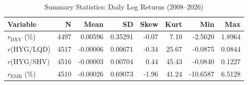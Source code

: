 \begin{table}[H]
\centering
\begin{tabular}{lrrrrrrr}
  \toprule
Variable & N & Mean & SD & Skew & Kurt & Min & Max \\ 
  \midrule
$r_{\text{DXY}}$ (\%) & 4497 & 0.00596 & 0.35291 & -0.07 & 7.10 & -2.5620 & 1.8964 \\
  $r$(HYG/LQD) & 4517 & -0.00006 & 0.00671 & -0.34 & 25.67 & -0.0875 & 0.0844 \\
  $r$(HYG/SHV) & 4516 & -0.00003 & 0.00704 & 0.44 & 45.43 & -0.0840 & 0.1227 \\
  $r_{\text{EMB}}$ (\%) & 4510 & -0.00026 & 0.69073 & -1.96 & 41.24 & -10.6587 & 6.5128 \\ 
   \bottomrule
\end{tabular}
\caption{Summary Statistics: Daily Log Returns (2008--2026)} 
\label{tab:sumstats_dollar}
\end{table}
